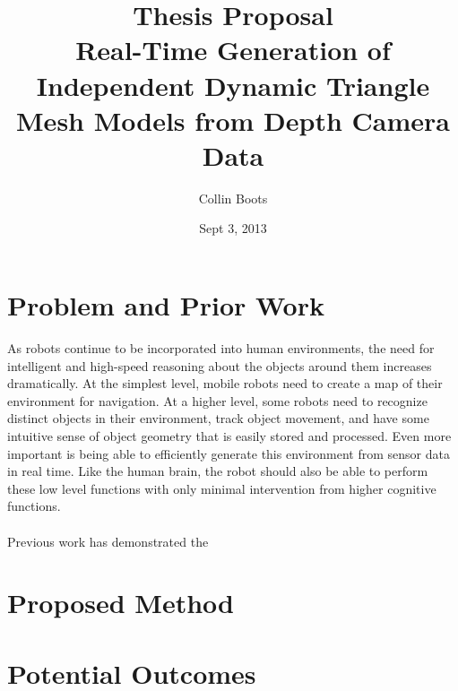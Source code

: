 \documentclass[english]{article}
\title{Thesis Proposal \\ Real-Time Generation of Independent Dynamic Triangle Mesh Models from Depth Camera Data}
\author{Collin Boots}
\date{Sept 3, 2013}
\begin{document}
\maketitle
\section*{Problem and Prior Work}
As robots continue to be incorporated into human environments, the need for intelligent and high-speed reasoning about the objects around them increases dramatically. At the simplest level, mobile robots need to create a map of their environment for navigation. At a higher level, some robots need to recognize distinct objects in their environment, track object movement, and have some intuitive sense of object geometry that is easily stored and processed. Even more important is being able to efficiently generate this environment from sensor data in real time. Like the human brain, the robot should also be able to perform these low level functions with only minimal intervention from higher cognitive functions.\\
\\
Previous work has demonstrated the 
\section*{Proposed Method}
\section*{Potential Outcomes}
\end{document}
